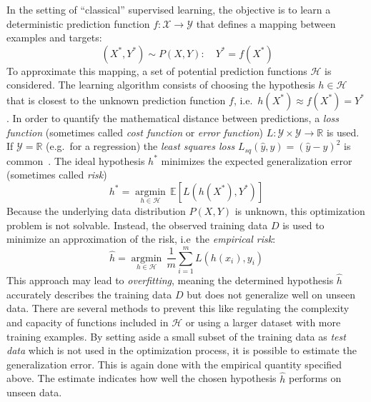 In the setting of \enquote{classical} supervised learning, the objective is to learn a deterministic prediction function $f: \mathcal{X} \rightarrow \mathcal{Y}$ that defines a mapping between examples and targets:
\[
    \, (X^*, Y^*) \sim P(X, Y): \quad  Y^* = f(X^*)
\]
To approximate this mapping, a set of potential prediction functions $\mathcal{H}$ is considered.
The learning algorithm consists of choosing the hypothesis $h \in \mathcal{H}$ that is closest to the unknown prediction function $f$, i.e.\ $h(X^*) \approx f(X^*) = Y^*$.
In order to quantify the mathematical distance between predictions, a \textit{loss function} (sometimes called \textit{cost function} or \textit{error function}) $L: \mathcal{Y} \times \mathcal{Y} \rightarrow \mathbb{R}$ is used.
If $\mathcal{Y} = \mathbb{R}$ (e.g.\ for a regression) the \textit{least squares loss} $L_{sq} (\hat{y}, y) = (\hat{y} - y)^2$ is common~\autocite{gressmann2019probabilistic}.
The ideal hypothesis $h^*$ minimizes the expected generalization error (sometimes called \textit{risk})
\[
    h^* = \underset{{h \in \mathcal{H}}}{\operatorname{argmin}} \, \mathbb{E}[L(h(X^*), Y^*)]
\]
Because the underlying data distribution $P(X, Y)$ is unknown, this optimization problem is not solvable.
Instead, the observed training data $D$ is used to minimize an approximation of the risk, i.e\ the \textit{empirical risk}:
\[
    \hat{h} = \underset{{h \in \mathcal{H}}}{\operatorname{argmin}} \, \frac{1}{m}\sum_{i=1}^{m} L(h(x_i), y_i)
\]
This approach may lead to \textit{overfitting}, meaning the determined hypothesis $\hat{h}$ accurately describes the training data $D$ but does not generalize well on unseen data.
There are several methods to prevent this like regulating the complexity and capacity of functions included in $\mathcal{H}$ or using a larger dataset with more training examples.
By setting aside a small subset of the training data as \textit{test data} which is not used in the optimization process, it is possible to estimate the generalization error.
This is again done with the empirical quantity specified above.
The estimate indicates how well the chosen hypothesis $\hat{h}$ performs on unseen data.

